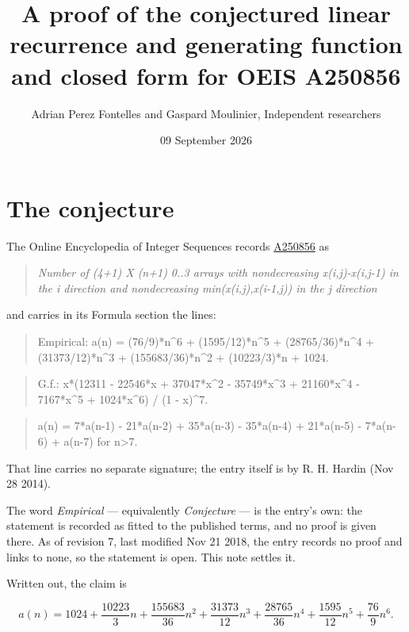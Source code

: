 \documentclass[11pt]{article}
\title{A proof of the conjectured linear recurrence and generating function and closed form for OEIS A250856}
\author{Adrian Perez Fontelles and Gaspard Moulinier, Independent researchers}
\date{09 September 2026}
\theoremstyle{definition}
\begin{document}
\maketitle
\section{The conjecture}

The Online Encyclopedia of Integer Sequences records \href{https://oeis.org/A250856}{A250856} as

\begin{quote}\itshape Number of (4+1) X (n+1) 0..3 arrays with nondecreasing x(i,j)-x(i,j-1) in the i direction and nondecreasing min(x(i,j),x(i-1,j)) in the j direction\end{quote}

and carries in its Formula section the lines:

\begin{quote}\ttfamily Empirical: a(n) = (76/9)*n\textasciicircum{}6 + (1595/12)*n\textasciicircum{}5 + (28765/36)*n\textasciicircum{}4 + (31373/12)*n\textasciicircum{}3 + (155683/36)*n\textasciicircum{}2 + (10223/3)*n + 1024.\end{quote}

\begin{quote}\ttfamily G.f.: x*(12311 - 22546*x + 37047*x\textasciicircum{}2 - 35749*x\textasciicircum{}3 + 21160*x\textasciicircum{}4 - 7167*x\textasciicircum{}5 + 1024*x\textasciicircum{}6) / (1 - x)\textasciicircum{}7.\end{quote}

\begin{quote}\ttfamily a(n) = 7*a(n-1) - 21*a(n-2) + 35*a(n-3) - 35*a(n-4) + 21*a(n-5) - 7*a(n-6) + a(n-7) for n>7.\end{quote}

That line carries no separate signature; the entry itself is by R. H. Hardin (Nov 28 2014).

The word {\itshape Empirical} --- equivalently {\itshape Conjecture} --- is the entry's own: the statement is recorded as fitted to the published terms, and no proof is given there. As of revision 7, last modified Nov 21 2018, the entry records no proof and links to none, so the statement is open. This note settles it.

Written out, the claim is

\[a(n) = 1024 + \frac{10223}{3}n + \frac{155683}{36}n^{2} + \frac{31373}{12}n^{3} + \frac{28765}{36}n^{4} + \frac{1595}{12}n^{5} + \frac{76}{9}n^{6}.\]
\end{document}

